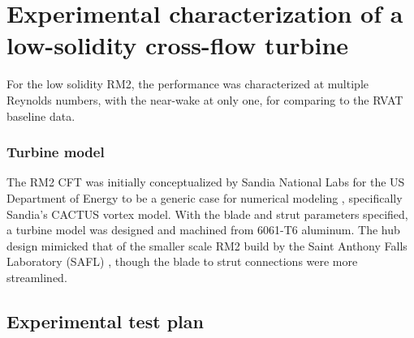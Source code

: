 \chapter{Experimental characterization of a low-solidity cross-flow turbine}

For the low solidity RM2, the performance was characterized at multiple Reynolds
numbers, with the near-wake at only one, for comparing to the RVAT baseline
data.

\subsection{Turbine model}

The RM2 CFT was initially conceptualized by Sandia National Labs for the US
Department of Energy to be a generic case for numerical modeling
\cite{Barone2011}, specifically Sandia's CACTUS vortex model. With the blade and
strut parameters specified, a turbine model was designed and machined from
6061-T6 aluminum. The hub design mimicked that of the smaller scale RM2 build by
the Saint Anthony Falls Laboratory (SAFL) \cite{Hill2014}, though the blade to
strut connections were more streamlined.

\section{Experimental test plan}